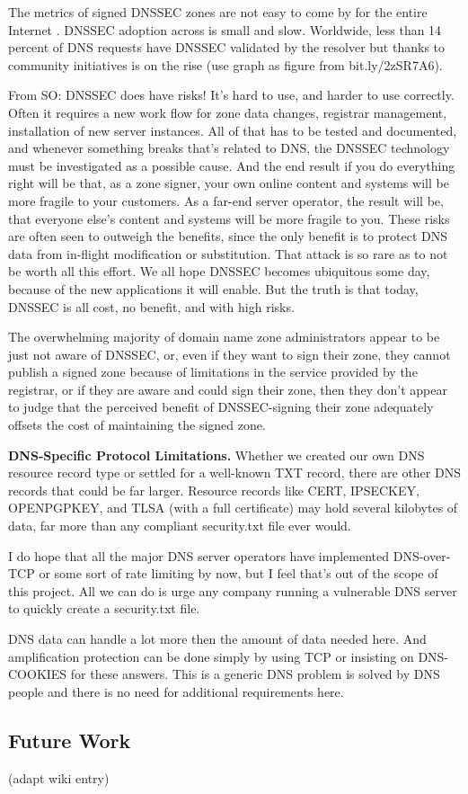 The metrics of signed DNSSEC zones are not easy to come by for the entire
Internet \cite{APNIC}. DNSSEC adoption across is small and slow. Worldwide, less
than 14 percent of DNS requests have DNSSEC validated by the resolver
\cite{APNIC} but thanks to community initiatives is on the rise
\cite{Cloudflare} (use graph as figure from bit.ly/2zSR7A6).

From SO: DNSSEC does have risks! It's hard to use, and harder to use correctly.
Often it requires a new work flow for zone data changes, registrar management,
installation of new server instances. All of that has to be tested and
documented, and whenever something breaks that's related to DNS, the DNSSEC
technology must be investigated as a possible cause. And the end result if you
do everything right will be that, as a zone signer, your own online content and
systems will be more fragile to your customers. As a far-end server operator,
the result will be, that everyone else's content and systems will be more
fragile to you. These risks are often seen to outweigh the benefits, since the
only benefit is to protect DNS data from in-flight modification or substitution.
That attack is so rare as to not be worth all this effort. We all hope DNSSEC
becomes ubiquitous some day, because of the new applications it will enable. But
the truth is that today, DNSSEC is all cost, no benefit, and with high risks.

The overwhelming majority of domain name zone administrators appear to be just
not aware of DNSSEC, or, even if they want to sign their zone, they cannot
publish a signed zone because of limitations in the service provided by the
registrar, or if they are aware and could sign their zone, then they don’t
appear to judge that the perceived benefit of DNSSEC-signing their zone
adequately offsets the cost of maintaining the signed zone.

\textbf{DNS-Specific Protocol Limitations.}    Whether we created our own DNS
resource record type or settled for a well-known TXT record, there are other DNS
records that could be far larger. Resource records like CERT, IPSECKEY,
OPENPGPKEY, and TLSA (with a full certificate) may hold several kilobytes of
data, far more than any compliant security.txt file ever would.

I do hope that all the major DNS server operators have implemented DNS-over-TCP
or some sort of rate limiting by now, but I feel that's out of the scope of this
project. All we can do is urge any company running a vulnerable DNS server to
quickly create a security.txt file.

DNS data can handle a lot more then the amount of data needed here. And
amplification protection can be done simply by using TCP or insisting on
DNS-COOKIES for these answers. This is a generic DNS problem is solved by DNS
people and there is no need for additional requirements here.

\subsection{Future Work}

(adapt wiki entry)
